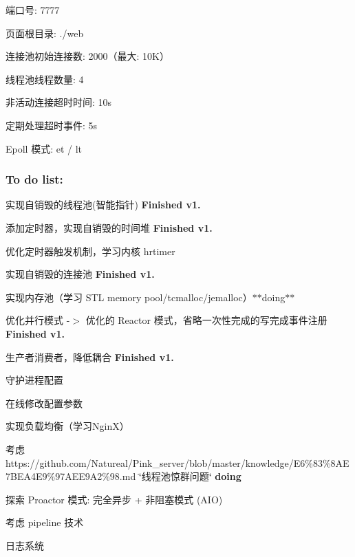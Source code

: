 \begin{DoxyItemize}
\item 端口号\+: 7777
\item 页面根目录\+: ./web
\item 连接池初始连接数\+: 2000（最大\+: 10\+K）
\item 线程池线程数量\+: 4
\item 非活动连接超时时间\+: 10s
\item 定期处理超时事件\+: 5s
\item Epoll 模式\+: et / lt 


\end{DoxyItemize}

\subsubsection*{To do list\+:}


\begin{DoxyEnumerate}
\item 实现自销毁的线程池(智能指针) {\bfseries Finished v1.}
\item 添加定时器，实现自销毁的时间堆 {\bfseries Finished v1.}
\item 优化定时器触发机制，学习内核 hrtimer
\item 实现自销毁的连接池 {\bfseries Finished v1.}
\item 实现内存池（学习 S\+TL memory pool/tcmalloc/jemalloc）$\ast$$\ast$doing$\ast$$\ast$
\item 优化并行模式 -\/$>$ 优化的 Reactor 模式，省略一次性完成的写完成事件注册 {\bfseries Finished v1.}
\item 生产者消费者，降低耦合 {\bfseries Finished v1.}
\item 守护进程配置
\item 在线修改配置参数
\item 实现负载均衡（学习\+Ngin\+X）
\item 考虑https\+://github.com/\+Natureal/\+Pink\+\_\+server/blob/master/knowledge/E6\%83\%8AE7BEA4E9\%97AEE9A2\%98.\+md \char`\"{}线程池惊群问题\char`\"{} {\bfseries doing}
\item 探索 Proactor 模式\+: 完全异步 + 非阻塞模式 (A\+IO)
\item 考虑 pipeline 技术
\item 日志系统 
\end{DoxyEnumerate}